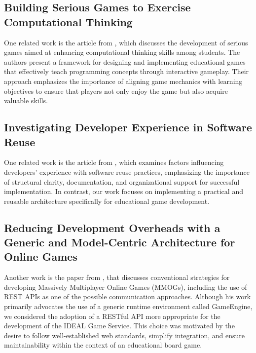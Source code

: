 \documentclass[english]{sbc2025}
\begin{document}

\subsection{Building Serious Games to Exercise Computational Thinking}

One related work is the article from \citep{Malpartida_Rodrigues_2025}, which discusses the development of serious games aimed at enhancing computational thinking skills among students. The authors present a framework for designing and implementing educational games that effectively teach programming concepts through interactive gameplay. Their approach emphasizes the importance of aligning game mechanics with learning objectives to ensure that players not only enjoy the game but also acquire valuable skills.  

\subsection{Investigating Developer Experience in Software Reuse}

One related work is the article from \citep{sbcars}, which examines factors influencing developers' experience with software reuse practices, emphasizing the importance of structural clarity, documentation, and organizational support for successful implementation. In contrast, our work focuses on implementing a practical and reusable architecture specifically for educational game development.	

\subsection{Reducing Development Overheads with a Generic and Model-Centric Architecture for Online Games}
Another work is the paper from \citep{apel2018reducing}, that discusses conventional strategies for developing Massively Multiplayer Online Games (MMOGs), including the use of REST APIs as one of the possible communication approaches. Although his work primarily advocates the use of a generic runtime environment called GameEngine, we considered the adoption of a RESTful API more appropriate for the development of the IDEAL Game Service. This choice was motivated by the desire to follow well-established web standards, simplify integration, and ensure maintainability within the context of an educational board game.
\end{document}
